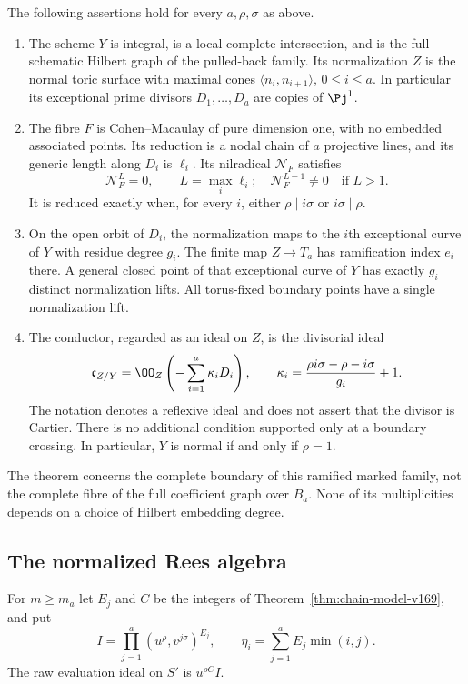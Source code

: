 \begin{theorem}\label{thm:ramified-boundary-v170}
The following assertions hold for every $a,\rho,\sigma$ as above.
\begin{enumerate}
\item The scheme $Y$ is integral, is a local complete intersection,
and is the full schematic Hilbert graph of the pulled-back family.
Its normalization $Z$ is the normal toric surface with maximal cones
$\langle n_i,n_{i+1}\rangle$, $0\leq i\leq a$. In particular its
exceptional prime divisors $D_1,\ldots,D_a$ are copies of $\Pj^1$.
\item The fibre $F$ is Cohen--Macaulay of pure dimension one, with
no embedded associated points. Its reduction is a nodal chain of
$a$ projective lines, and its generic length along $D_i$ is $\ell_i$.
Its nilradical $\mathcal N_F$ satisfies
\[
 \mathcal N_F^{L}=0,\qquad L=\max_i\ell_i;
 \quad \mathcal N_F^{L-1}\ne0\quad\text{if }L>1.
\]
It is reduced exactly when, for every $i$, either $\rho\mid i\sigma$
or $i\sigma\mid\rho$.
\item On the open orbit of $D_i$, the normalization maps to the
$i$th exceptional curve of $Y$ with residue degree $g_i$. The finite
map $Z\to T_a$ has ramification index $e_i$ there. A general closed
point of that exceptional curve of $Y$ has exactly $g_i$ distinct
normalization lifts. All torus-fixed boundary points have a single
normalization lift.
\item The conductor, regarded as an ideal on $Z$, is the divisorial
ideal
\begin{equation}\label{eq:conductor-divisor-v170}
 \mathfrak c_{Z/Y}=\OO_Z\left(-\sum_{i=1}^a\kappa_iD_i\right),
 \qquad
 \kappa_i=\frac{\rho i\sigma-\rho-i\sigma}{g_i}+1.
\end{equation}
The notation denotes a reflexive ideal and does not assert that the
divisor is Cartier. There is no additional condition supported only
at a boundary crossing. In particular, $Y$ is normal if and only if
$\rho=1$.
\end{enumerate}
The theorem concerns the complete boundary of this ramified marked
family, not the complete fibre of the full coefficient graph over
$B_a$. None of its multiplicities depends on a choice of Hilbert
embedding degree.
\end{theorem}

\subsection{The normalized Rees algebra}
For $m\geq m_a$ let $E_j$ and $C$ be the integers of
Theorem~\ref{thm:chain-model-v169}, and put
\[
 I=\prod_{j=1}^a(u^\rho,v^{j\sigma})^{E_j},\qquad
 \eta_i=\sum_{j=1}^a E_j\min(i,j).
\]
The raw evaluation ideal on $S'$ is $u^{\rho C}I$.

